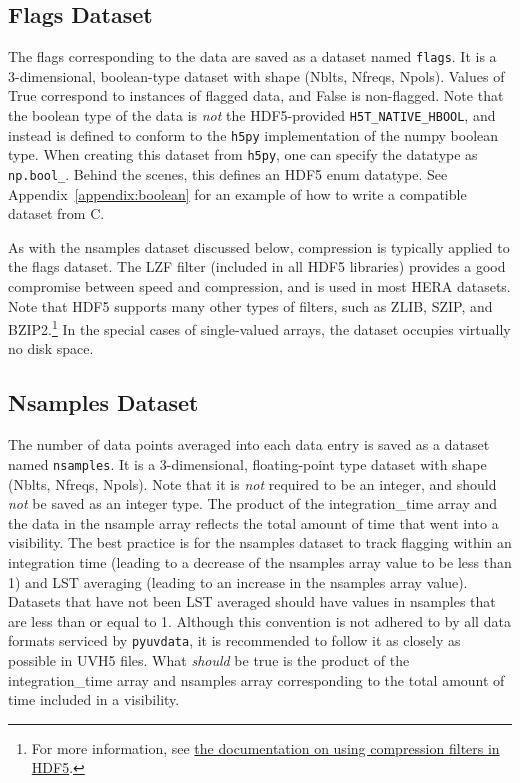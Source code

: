 \documentclass[11pt, oneside]{article}
\begin{document}
\subsection{Flags Dataset}
\label{sec:flags}
The flags corresponding to the data are saved as a dataset named
\verb+flags+. It is a 3-dimensional, boolean-type dataset with shape (Nblts,
Nfreqs, Npols). Values of True correspond to instances of flagged data, and
False is non-flagged. Note that the boolean type of the data is \textit{not} the
HDF5-provided \verb+H5T_NATIVE_HBOOL+, and instead is defined to conform to the
\verb+h5py+ implementation of the numpy boolean type. When creating this dataset
from \verb+h5py+, one can specify the datatype as \verb+np.bool_+. Behind the
scenes, this defines an HDF5 enum datatype. See Appendix~\ref{appendix:boolean}
for an example of how to write a compatible dataset from C.

As with the nsamples dataset discussed below, compression is typically applied
to the flags dataset. The LZF filter (included in all HDF5 libraries) provides a
good compromise between speed and compression, and is used in most HERA
datasets. Note that HDF5 supports many other types of filters, such as ZLIB,
SZIP, and BZIP2.\footnote{For more information, see
  \href{https://portal.hdfgroup.org/display/HDF5/Using+Compression+in+HDF5}{the
    documentation on using compression filters in HDF5}.} In the special cases
of single-valued arrays, the dataset occupies virtually no disk space.

\subsection{Nsamples Dataset}
\label{sec:nsamples}
The number of data points averaged into each data entry is saved as a dataset
named \verb+nsamples+. It is a 3-dimensional, floating-point type dataset with
shape (Nblts, Nfreqs, Npols). Note that it is \textit{not} required to be an
integer, and should \textit{not} be saved as an integer type. The product of the
integration\_time array and the data in the nsample array reflects the total
amount of time that went into a visibility. The best practice is for the
nsamples dataset to track flagging within an integration time (leading to a
decrease of the nsamples array value to be less than 1) and LST averaging
(leading to an increase in the nsamples array value). Datasets that have not
been LST averaged should have values in nsamples that are less than or equal to
1. Although this convention is not adhered to by all data formats serviced by
\verb+pyuvdata+, it is recommended to follow it as closely as possible in UVH5
files. What \textit{should} be true is the product of the integration\_time
array and nsamples array corresponding to the total amount of time included in a
visibility.
\end{document}
